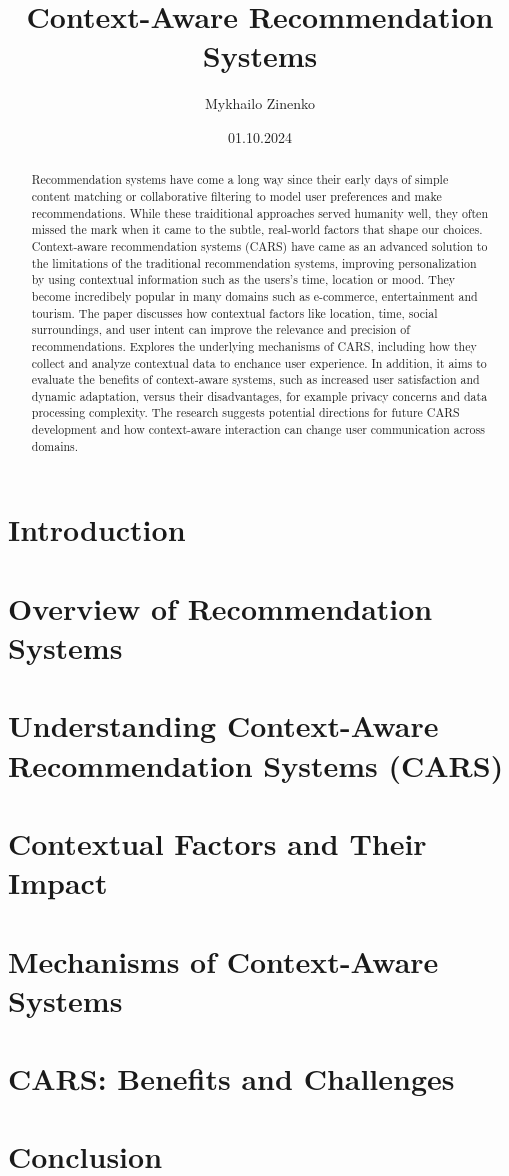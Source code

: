 \documentclass[11pt]{article} %
\title{Context-Aware Recommendation Systems}
\author{Mykhailo Zinenko}
\date{01.10.2024} %
\begin{document}
\maketitle

\begin{abstract}
Recommendation systems have come a long way since their early days of simple content matching or collaborative filtering to model user preferences and make recommendations. While these traiditional approaches served humanity well, they often missed the mark when it came to the subtle, real-world factors that shape our choices. Context-aware recommendation systems (CARS) have came as an advanced solution to the limitations of the traditional recommendation systems, improving personalization by using contextual information such as the users's time, location or mood. They become incredibely popular in many domains such as e-commerce, entertainment and tourism. The paper discusses how contextual factors like location, time, social surroundings, and user intent can improve the relevance and precision of recommendations. Explores the underlying mechanisms of CARS, including how they collect and analyze contextual data to enchance user experience. In addition, it aims to evaluate the benefits of context-aware systems, such as increased user satisfaction and dynamic adaptation, versus their disadvantages, for example privacy concerns and data processing complexity. The research suggests potential directions for future CARS development and how context-aware interaction can change user communication across domains.
\end{abstract}

\section{Introduction}

\section{Overview of Recommendation Systems}

\section{Understanding Context-Aware Recommendation Systems (CARS)}

\section{Contextual Factors and Their Impact}

\section{Mechanisms of Context-Aware Systems}

\section{CARS: Benefits and Challenges}

\section{Conclusion}



\end{document}
